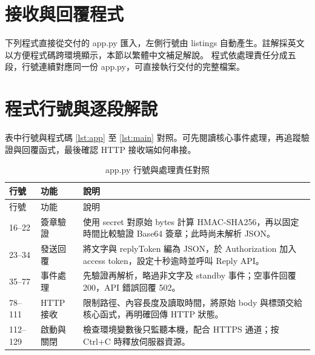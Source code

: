 \documentclass[12pt,a4paper]{report}
\begin{document}
\section{接收與回覆程式}
下列程式直接從交付的 app.py 匯入，左側行號由 listings 自動產生。註解採英文以方便程式碼跨環境顯示，本節以繁體中文補足解說。
程式依處理責任分成五段，行號連續對應同一份 app.py，可直接執行交付的完整檔案。
\Needspace{330pt}

\Needspace{190pt}

\Needspace{600pt}

\Needspace{490pt}

\Needspace{300pt}


\section{程式行號與逐段解說}
表中行號與程式碼 \ref{lst:app} 至 \ref{lst:main} 對照。可先閱讀核心事件處理，再追蹤驗證與回覆函式，最後確認 HTTP 接收端如何串接。
\begin{longtable}{p{17mm}p{26mm}p{105mm}}
\caption{app.py 行號與處理責任對照}\\
\toprule 行號 & 功能 & 說明\\\midrule\endfirsthead
\toprule 行號 & 功能 & 說明\\\midrule\endhead
16--22 & 簽章驗證 & 使用 secret 對原始 bytes 計算 HMAC-SHA256，再以固定時間比較驗證 Base64 簽章；此時尚未解析 JSON。\\
23--34 & 發送回覆 & 將文字與 replyToken 編為 JSON，於 Authorization 加入 access token，設定十秒逾時並呼叫 Reply API。\\
35--77 & 事件處理 & 先驗證再解析，略過非文字及 standby 事件；空事件回覆 200，API 錯誤回覆 502。\\
78--111 & HTTP 接收 & 限制路徑、內容長度及讀取時間，將原始 body 與標頭交給核心函式，再明確回傳 HTTP 狀態。\\
112--129 & 啟動與關閉 & 檢查環境變數後只監聽本機，配合 HTTPS 通道；按 Ctrl+C 時釋放伺服器資源。\\
\bottomrule
\end{longtable}
\end{document}
